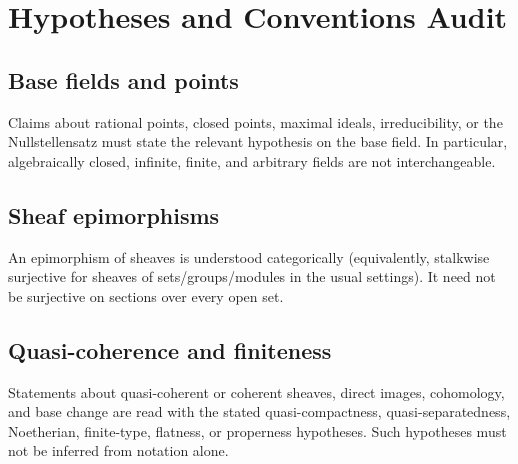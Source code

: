 \chapter*{Hypotheses and Conventions Audit}
{}

\section*{Base fields and points}
Claims about rational points, closed points, maximal ideals, irreducibility, or
the Nullstellensatz must state the relevant hypothesis on the base field.
In particular, algebraically closed, infinite, finite, and arbitrary fields are
not interchangeable.

\section*{Sheaf epimorphisms}
An epimorphism of sheaves is understood categorically (equivalently, stalkwise
surjective for sheaves of sets/groups/modules in the usual settings).  It need
not be surjective on sections over every open set.

\section*{Quasi-coherence and finiteness}
Statements about quasi-coherent or coherent sheaves, direct images, cohomology,
and base change are read with the stated quasi-compactness, quasi-separatedness,
Noetherian, finite-type, flatness, or properness hypotheses.  Such hypotheses
must not be inferred from notation alone.
